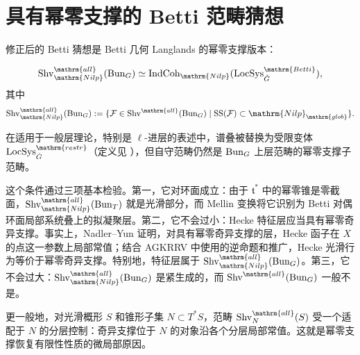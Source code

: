 \section{具有幂零支撑的 Betti 范畴猜想}\label{sec:11.6}
修正后的 Betti 猜想是 Betti 几何 Langlands 的幂零支撑版本\cite{BZN16,NY19}：
\begin{conjecture*}{}
\[\Shv^{\mathrm{all}}_{\mathrm{Nilp}}(\Bun_G)\simeq\IndCoh_{\mathrm{Nilp}}(\LocSys^{\mathrm{Betti}}_{\checkG}),\]
其中
\[\Shv^{\mathrm{all}}_{\mathrm{Nilp}}(\Bun_G):=\{\cF\in\Shv^{\mathrm{all}}(\Bun_G)\mid\operatorname{SS}(\cF)\subset\mathrm{Nilp}_{\mathrm{glob}}\}.\]
\end{conjecture*}
在适用于一般层理论，特别是 $\ell$-进层的表述中，谱叠被替换为受限变体 $\LocSys^{\mathrm{restr}}_{\checkG}$（定义见 ），但自守范畴仍然是 $\operatorname{Bun}_G$ 上层范畴的幂零支撑子范畴。

这个条件通过三项基本检验。第一，它对环面成立：由于 $\mathfrak t^*$ 中的幂零锥是零截面，$\Shv^{\mathrm{all}}_{\mathrm{Nilp}}(\Bun_T)$ 就是光滑部分，而 Mellin 变换将它识别为 Betti 对偶环面局部系统叠上的拟凝聚层。第二，它不会过小：Hecke 特征层应当具有幂零奇异支撑。事实上，Nadler–Yun 证明，对具有幂零奇异支撑的层，Hecke 函子在 $X$ 的点这一参数上局部常值\cite{NY19}；结合 AGKRRV 中使用的逆命题和推广\cite{AGK20a}，Hecke 光滑行为等价于幂零奇异支撑。特别地，特征层属于 $\Shv^{\mathrm{all}}_{\mathrm{Nilp}}(\Bun_G)$。第三，它不会过大：$\Shv^{\mathrm{all}}_{\mathrm{Nilp}}(\Bun_G)$ 是紧生成的，而 $\Shv^{\mathrm{all}}(\Bun_G)$ 一般不是。

更一般地，对光滑概形 $S$ 和锥形子集 $N\subset T^*S$，范畴 $\Shv^{\mathrm{all}}_N(S)$ 受一个适配于 $N$ 的分层控制：奇异支撑位于 $N$ 的对象沿各个分层局部常值。这就是幂零支撑恢复有限性性质的微局部原因。
